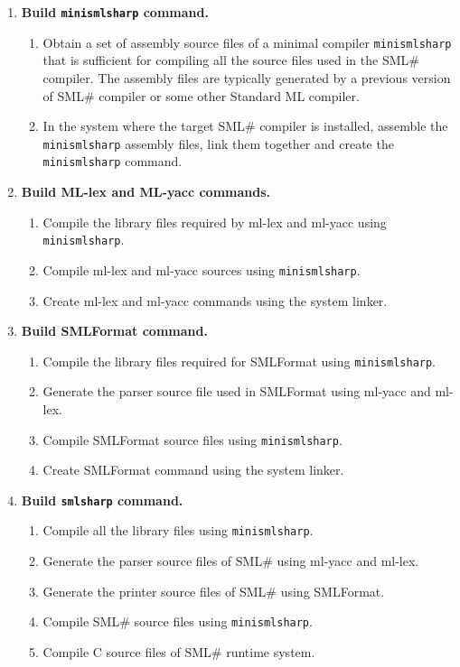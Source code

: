 \documentclass{jbook}
\newcommand{\smlsharp}{SML\#}
\begin{document}
\begin{enumerate}
\item {\bf Build {\tt minismlsharp} command.}
\begin{enumerate}
\item 
	Obtain a set of assembly source files of a minimal compiler
{\tt minismlsharp} that is sufficient for compiling all the source files
used in the \smlsharp{} compiler. 
	The assembly files are typically generated by a previous version
of \smlsharp{} compiler or some other Standard ML compiler. 
\item 
	In the system where the target \smlsharp{} compiler is
installed, assemble the {\tt minismlsharp} assembly files, link them
together and create the {\tt minismlsharp} command.
\end{enumerate}
\item {\bf Build ML-lex and ML-yacc commands.}
\begin{enumerate}
\item Compile the library files required by ml-lex and ml-yacc 
using {\tt minismlsharp}. 
\item Compile ml-lex and ml-yacc sources using {\tt minismlsharp}.
\item Create ml-lex and ml-yacc commands using the system linker.
\end{enumerate}
\item {\bf Build SMLFormat command.}
\begin{enumerate}
\item Compile the library files required for SMLFormat
using  {\tt minismlsharp}.
\item Generate the parser source file used in SMLFormat using ml-yacc
and ml-lex.
\item Compile SMLFormat source files using {\tt minismlsharp}.
\item Create SMLFormat command using the system linker.
\end{enumerate}
\item {\bf Build {\tt smlsharp} command.}
\begin{enumerate}
\item Compile all the library files using {\tt minismlsharp}.
\item Generate the parser source files of \smlsharp{} using ml-yacc and ml-lex.
\item Generate the printer source files of \smlsharp{} using SMLFormat.
\item Compile \smlsharp{} source files using {\tt minismlsharp}.
\item Compile C source files of \smlsharp{} runtime system.

\end{enumerate}
\end{enumerate}
\end{document}
